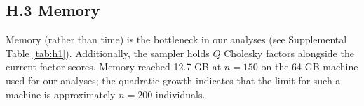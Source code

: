 \documentclass{article}
\begin{document}
\subsection*{H.3 Memory}
 
Memory (rather than time) is the bottleneck in our analyses (see Supplemental Table \ref{tab:h1}). Additionally, the sampler holds $Q$ Cholesky factors alongside the current
factor scores. Memory reached 12.7 GB at $n=150$ on the
64 GB machine used for our analyses; the quadratic growth indicates that the limit for such a machine is approximately $n=200$ individuals.
\end{document}
